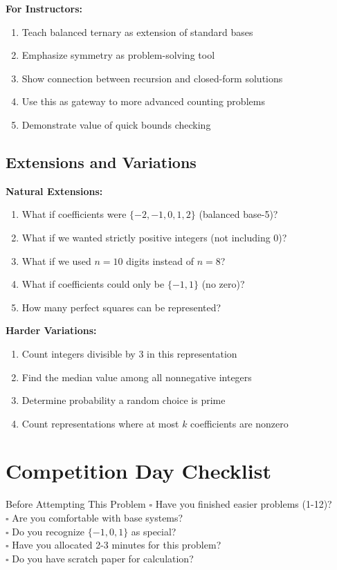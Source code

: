\documentclass[12pt]{article}
\begin{document}
\textbf{For Instructors:}
\begin{enumerate}
    \item Teach balanced ternary as extension of standard bases
    \item Emphasize symmetry as problem-solving tool
    \item Show connection between recursion and closed-form solutions
    \item Use this as gateway to more advanced counting problems
    \item Demonstrate value of quick bounds checking
\end{enumerate}

\subsection*{Extensions and Variations}

\textbf{Natural Extensions:}
\begin{enumerate}
    \item What if coefficients were $\{-2,-1,0,1,2\}$ (balanced base-5)?
    \item What if we wanted strictly positive integers (not including 0)?
    \item What if we used $n=10$ digits instead of $n=8$?
    \item What if coefficients could only be $\{-1,1\}$ (no zero)?
    \item How many perfect squares can be represented?
\end{enumerate}

\textbf{Harder Variations:}
\begin{enumerate}
    \item Count integers divisible by 3 in this representation
    \item Find the median value among all nonnegative integers
    \item Determine probability a random choice is prime
    \item Count representations where at most $k$ coefficients are nonzero
\end{enumerate}

\section*{Competition Day Checklist}

\begin{highlightbox}{Before Attempting This Problem}
$\square$ Have you finished easier problems (1-12)?\\
$\square$ Are you comfortable with base systems?\\
$\square$ Do you recognize $\{-1,0,1\}$ as special?\\
$\square$ Have you allocated 2-3 minutes for this problem?\\
$\square$ Do you have scratch paper for calculation?
\end{highlightbox}
\end{document}
